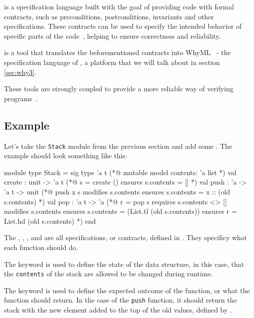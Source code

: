 \gospellang is a specification language built with the goal of providing \ocaml code 
with formal contracts, such as preconditions, postconditions, invariants and other 
specifications. These contracts can be used to specify the intended behavior of 
specific parts of the code~\cite{Soares_Chirica_Pereira2024}, helping to ensure correctness and reliability.

\cameleer is a tool that translates the beforementioned contracts into WhyML~\cite{Pereira_Ravara2021} - 
the specification language of \why, a platform that we will talk about in 
section \ref{sec:why3}.

These tools are strongly coupled to provide a more reliable way of verifying 
\ocaml programs~\cite{Pereira2024}.

\subsection{Example}
\label{sub:example}

Let's take the \texttt{Stack} module from the previous section and add some \gospellang. 
The example should look something like this:

\begin{gospel}
    module type Stack = sig
        type 'a t
        (*@ mutable model contents: 'a list *)
        val create : unit -> 'a t
        (*@ s = create ()
            ensures s.contents = [] *)
        val push : 'a -> 'a t -> unit
        (*@ push x s
            modifies s.contents
            ensures s.contents = x :: (old s.contents) *)
        val pop : 'a t -> 'a
        (*@ r = pop s
            requires s.contents <> []
            modifies s.contents
            ensures s.contents = (List.tl (old s.contents))
            ensures r = List.hd (old s.contents) *)
    end
\end{gospel}

The , , , and  are all specifications, 
or contracts, defined in \gospellang. They specificy what each function should do.

The  keyword is used to define the state of the data structure, in this case, 
that the \texttt{contents} of the stack are allowed to be changed during runtime.

The keyword  is used to define the expected outcome of the function, or what the function 
should return. In the case of the \texttt{push} function, it should return the stack with 
the new element added to the top of the old values, defined by .

